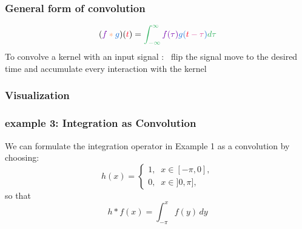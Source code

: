 \documentclass{beamer}
\newcommand{\plain}{\color{black}}
\newcommand{\growth}{\color{c1}}
\newcommand{\unitQuantity}{\color{c2}}
\newcommand{\unitInterest}{\color{c3}}
\newcommand{\unitTime}{\color{c4}}
\newcommand{\perfectly}{\color{c5}}
\newcommand{\compounded}{\color{c6}}
\begin{document}
\begin{frame}
	\frametitle{General form of convolution}
	$$\plain ( 
	\growth f
\perfectly *
\unitTime g
	\plain )
	\plain (
	\unitInterest t
	\plain )
\plain =
	\unitQuantity \int_{-\infty}^{\infty} \growth f(\tau)
	\unitTime g(\unitInterest t \compounded -\tau \unitTime) \unitQuantity d\tau 
$$
\perfectly To convolve
\growth       a kernel
\plain        with an 
\unitTime input signal :
\
\compounded flip the signal
\unitInterest move to the desired time 
\unitQuantity and accumulate every interaction  
\growth with the kernel

\end{frame}
\begin{frame}
	\frametitle{Visualization}
\end{frame}
\begin{frame}
	\frametitle{example 3: Integration as Convolution}
We can formulate the integration operator in Example 1 as a convolution by choosing: 
	$$ h(x) = \begin{cases}
	1, \; \; x \in [-\pi, 0]  , \\
        0,  \; \; x \in ]0,\pi]  ,
\end{cases} $$
so that 
	$$ h * f(x) = \int_{-\pi}^{x} f(y) \, dy $$ 
\end{frame}
\end{document}
